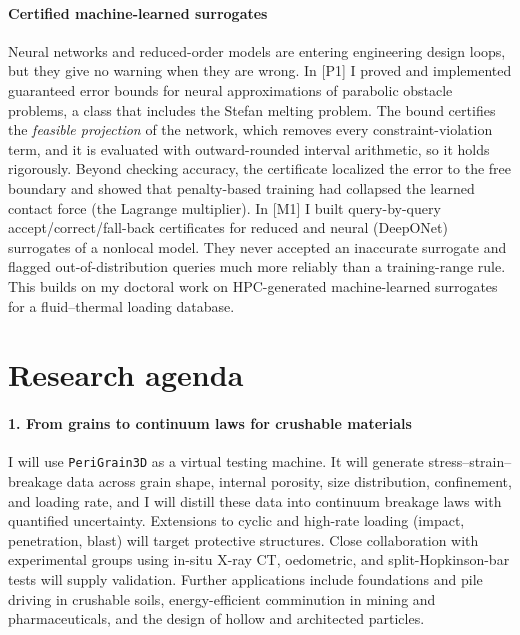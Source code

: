 \documentclass[11pt]{article}
\newcommand{\rc}[1]{\textcolor{accent}{[#1]}}
\begin{document}
\paragraph{Certified machine-learned surrogates}
Neural networks and reduced-order models are entering engineering design loops,
but they give no warning when they are wrong. In \rc{P1} I proved and
implemented guaranteed error bounds for neural approximations of parabolic
obstacle problems, a class that includes the Stefan melting problem. The bound
certifies the \emph{feasible projection} of the network, which removes every
constraint-violation term, and it is evaluated with outward-rounded interval
arithmetic, so it holds rigorously. Beyond checking accuracy, the certificate
localized the error to the free boundary and showed that penalty-based
training had collapsed the learned contact force (the Lagrange multiplier).
In \rc{M1} I built query-by-query accept/correct/fall-back certificates for
reduced and neural (DeepONet) surrogates of a nonlocal model. They never
accepted an inaccurate surrogate and flagged out-of-distribution queries much
more reliably than a training-range rule. This builds on my doctoral work on
HPC-generated machine-learned surrogates for a fluid--thermal loading database.

\section{Research agenda}

\paragraph{1. From grains to continuum laws for crushable materials}
I will use \texttt{PeriGrain3D} as a virtual testing machine. It will generate
stress--strain--breakage data across grain shape, internal porosity, size
distribution, confinement, and loading rate, and I will distill these data into
continuum breakage laws with quantified uncertainty. Extensions to cyclic and
high-rate loading (impact, penetration, blast) will target protective
structures. Close collaboration with experimental groups using in-situ X-ray
CT, oedometric, and split-Hopkinson-bar tests will supply validation. Further
applications include foundations and pile driving in crushable soils,
energy-efficient comminution in mining and pharmaceuticals, and the design of
hollow and architected particles.
\end{document}
